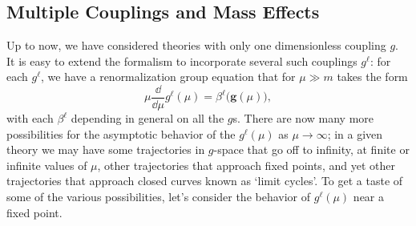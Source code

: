 
\subsection{Multiple Couplings and Mass Effects}

Up to now, we have considered theories with only one dimensionless coupling $g$. It is easy to extend the formalism to incorporate several such couplings $g^\ell$: for each $g^\ell$, we have a renormalization group equation that for $\mu\gg m$ takes the form
\begin{equation}
\mu\frac{\dd}{\dd\mu}g^\ell(\mu)=\beta^\ell\bigl(\mathbf{g}(\mu)\bigr),
\tag{18.4.1}\label{eq:18.4.1}
\end{equation}
with each $\beta^\ell$ depending in general on all the $g$s. There are now many more possibilities for the asymptotic behavior of the $g^\ell(\mu)$ as $\mu\to\infty$; in a given theory we may have some trajectories in $g$-space that go off to infinity, at finite or infinite values of $\mu$, other trajectories that approach fixed points, and yet other trajectories that approach closed curves known as `limit cycles'. To get a taste of some of the various possibilities, let's consider the behavior of $g^\ell(\mu)$ near a fixed point.


